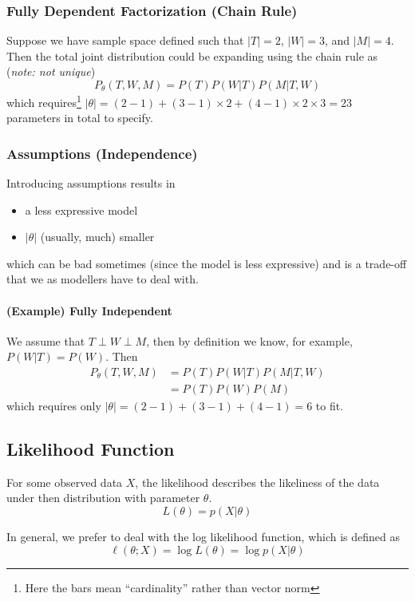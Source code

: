 \documentclass[11pt]{article}
\newcommand{\independent}{\perp}
\begin{document}
\subsubsection{Fully Dependent Factorization (Chain Rule)}
Suppose we have sample space defined such that $|T| = 2$, $|W| = 3$, and $|M| = 4$. Then the total joint distribution could be expanding using the chain rule as (\textit{note: not unique})
\begin{equation}
    P_\theta(T,W,M) = P(T)P(W|T)P(M|T,W)
\end{equation} 
which requires\footnote{Here the bars mean ``cardinality'' rather than vector norm} $|\theta| = (2 - 1) + (3 - 1) \times 2 + (4 - 1)\times 2 \times 3 = 23$ parameters in total to specify. 

\subsubsection{Assumptions (Independence)}
Introducing assumptions results in
\begin{itemize}
    \item a less expressive model
    \item $|\theta|$ (usually, much) smaller
\end{itemize}
which can be bad sometimes (since the model is less expressive) and is a trade-off that we as modellers have to deal with. 

\paragraph{(Example) Fully Independent}
We assume that $T\independent W \independent M$, then by definition we know, for example, $P(W|T)= P(W)$. Then
\begin{align}
    P_\theta(T,W,M) &= P(T)P(W|T)P(M|T,W) \\
    &= P(T)P(W)P(M)
\end{align}
which requires only $|\theta| = (2-1) + (3-1) + (4-1) = 6$ to fit.

\subsection{Likelihood Function}
For some observed data $X$, the likelihood describes the likeliness of the data under then distribution with parameter $\theta$. 
\begin{equation}
    L(\theta) = p(X|\theta)
\end{equation}

In general, we prefer to deal with the log likelihood function, which is defined as
\begin{equation}
    \ell(\theta;X) = \log L(\theta) = \log p(X|\theta)
\end{equation}
\end{document}
